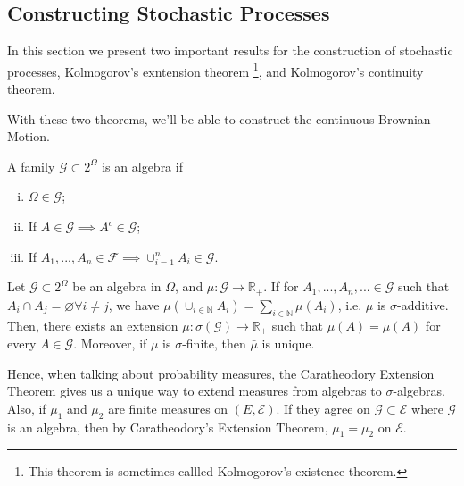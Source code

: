 \subsection{Constructing Stochastic Processes}

In this section we present two important results for the construction
of stochastic processes, Kolmogorov's exntension theorem
\footnote{This theorem is sometimes callled Kolmogorov's existence theorem.}, and
Kolmogorov's continuity theorem.

With these two theorems, we'll be able to construct the continuous Brownian Motion.

\begin{shaded}
	\begin{definition}[Algebra]
		A family $\mathcal G \subset 2^{\Omega}$ is an algebra if
		\begin{enumerate}[(i)]
			\item $\Omega \in \mathcal G$;
			\item If $ A \in \mathcal G \implies A^c \in \mathcal G$;
			\item If $A_1,..., A_n \in \mathcal F \implies \cup^n_{i=1} A_i \in \mathcal G$.
		\end{enumerate}
	\end{definition}

	\begin{theorem}
		Let $\mathcal G \subset \mathcal 2^\Omega$ be an algebra in $\Omega$,
		and $\mu :\mathcal G \to \mathbb R_+$.
		If for $A_1,...,A_n,... \in \mathcal G$ such that
		$A_i\cap A_j = \varnothing \forall i\neq j$, we have
		$\mu(\cup_{i \in \mathbb N}A_i) = \sum_{i\in\mathbb N} \mu(A_i)$, i.e.
		$\mu$ is $\sigma$-additive. Then, there exists an extension
		$\bar\mu:\sigma(\mathcal G)\to \mathbb R_+$ such that $\bar\mu(A)=\mu(A)$
		for every $A \in \mathcal G$.
		Moreover, if $\mu$ is $\sigma$-finite, then $\bar \mu$ is unique.
		\label{thm:caratheodoryextension}
	\end{theorem}
	Hence, when talking about probability measures, the Caratheodory Extension
	Theorem gives us a unique way to extend measures from algebras to $\sigma$-algebras.
	Also, if $\mu_1$ and $\mu_2$ are finite measures on $(E,\mathcal E)$. If they
	agree on $\mathcal G \subset \mathcal E$ where $\mathcal G$ is an algebra,
	then by Caratheodory's Extension Theorem, $\mu_1 = \mu_2$ on $\mathcal E$.
\end{shaded}

